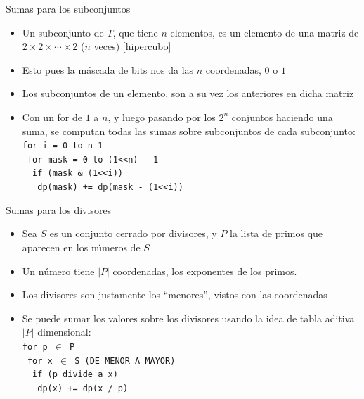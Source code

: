 \documentclass{beamer}
\begin{document}
\begin{frame}{Sumas para los subconjuntos}
    \begin{itemize}
		\item Un subconjunto de $T$, que tiene $n$ elementos, es un elemento de una matriz de $2 \times 2 \times \cdots \times 2$ ($n$ veces) [hipercubo]
        \item Esto pues la máscada de bits nos da las $n$ coordenadas, $0$ o $1$
        \item Los subconjuntos de un elemento, son a su vez los anteriores en dicha matriz
        \item Con un for de $1$ a $n$, y luego pasando por los $2^n$ conjuntos haciendo una suma, se computan todas las sumas sobre subconjuntos de
        cada subconjunto: \\
        \texttt{for i = 0 to n-1}\\
        \texttt{\ for mask = 0 to (1<<n) - 1}\\
        \texttt{\ \ if (mask \& (1<<i))}\\
        \texttt{\ \ \ dp(mask) += dp(mask - (1<<i))}\\
        
    \end{itemize}
\end{frame}

\begin{frame}{Sumas para los divisores}
    \begin{itemize}
		\item Sea $S$ es un conjunto cerrado por divisores, y $P$ la lista de primos que aparecen en los números de $S$
        \item Un número tiene $|P|$ coordenadas, los exponentes de los primos.
        \item Los divisores son justamente los ``menores'', vistos con las coordenadas
        \item Se puede sumar los valores sobre los divisores usando la idea de tabla aditiva $|P|$ dimensional:\\
        \texttt{for p $\in$ P}\\
        \texttt{\ for x $\in$ S (DE MENOR A MAYOR)}\\
        \texttt{\ \ if (p divide a x)}\\
        \texttt{\ \ \ dp(x) += dp(x / p)}\\
        
    \end{itemize}
\end{frame}
\end{document}
